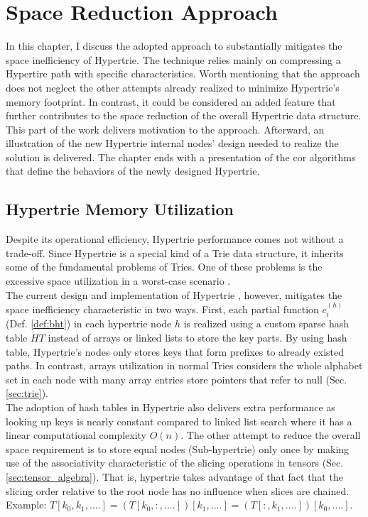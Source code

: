 \chapter{Space Reduction Approach}
\label{ch:approach}

In this chapter, I discuss the adopted approach to substantially mitigates the space inefficiency of Hypertrie.  
The technique relies mainly on compressing a Hypertire path with specific characteristics. 
Worth mentioning that the approach does not neglect the other attempts already realized to minimize Hypertrie's memory footprint. 
In contrast, it could be considered an added feature that further contributes to the space reduction of the overall Hypertrie data structure. \\

This part of the work delivers motivation to the approach. Afterward, an illustration of the new Hypertrie internal nodes' design needed to realize the solution is delivered. The chapter ends with a presentation of the cor algorithms that define the behaviors of the newly designed Hypertrie. 


\section{Hypertrie Memory Utilization}
\label{sec:hypertrie_memory_utilization}
Despite its operational efficiency, Hypertrie performance comes not without a trade-off. 
Since Hypertrie is a special kind of a Trie data structure, it inherits some of the fundamental problems of  Tries. 
One of these problems is the excessive space utilization in a worst-case scenario \cite{Brass:2008:ADS:1434862}.  \\

The current design and implementation of Hypertrie \cite{tentris2020}, however, mitigates the space inefficiency characteristic in two ways. 
First, each partial function $c^{(h)}_i$ (Def. \ref{def:bht}) in each hypertrie node $h$ is realized using a custom sparse hash table $HT$ instead of arrays or linked lists to store the key parts. 
By using hash table, Hypertrie's nodes only stores keys that form prefixes to already existed paths. 
In contrast, arrays utilization in normal Tries considers the whole alphabet set in each node with many array entries store pointers that refer to null (Sec. \ref{sec:trie}).  \\

The adoption of hash tables in Hypertrie also delivers extra performance as looking up keys is nearly constant compared to linked list search where it has a linear computational complexity $O(n)$. 
The other attempt to reduce the overall space requirement is to store equal nodes (Sub-hypertrie) only once by making use of the associativity characteristic of the slicing operations in tensors (Sec. \ref{sec:tensor_algebra}). That is, hypertrie takes advantage of that fact that the slicing order relative to the root node has no influence when slices are chained. Example: $T[k_0, k_1, ....] = (T[k_0, :, ....])[k_1, ....] = (T[:, k_1, ....])[k_0, ....].$ \\

